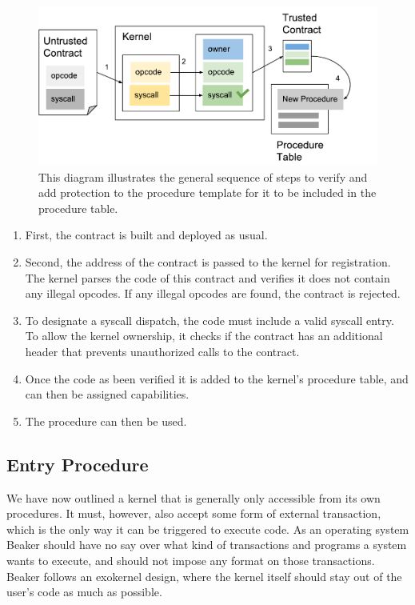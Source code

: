 \documentclass[english,a4paper]{article}
\begin{document}
\begin{figure}[htbp]
\centering
\includegraphics[width=1\textwidth]{media/ProcedureCreation.pdf}
\caption{This diagram illustrates the general sequence of steps to
verify and add protection to the procedure template for it to be
included in the procedure table.}
\end{figure}


\begin{enumerate}
\def\labelenumi{\arabic{enumi}.}
\item
  First, the contract is built and deployed as usual.
\item
  Second, the address of the contract is passed to the kernel for registration.
  The kernel parses the code of this contract and verifies it does not contain
  any illegal opcodes. If any illegal opcodes are found, the contract is
  rejected.
\item
  To designate a syscall dispatch, the code must include a valid syscall
  entry. To allow the kernel ownership, it checks if the contract has an
  additional header that prevents unauthorized calls to the contract.
\item
  Once the code as been verified it is added to the kernel's procedure table,
  and can then be assigned capabilities.
\item
  The procedure can then be used.
\end{enumerate}

\subsection{Entry Procedure}\label{entry-procedure}
We have now outlined a kernel that is generally only accessible from its
own procedures. It must, however, also accept some form of external
transaction, which is the only way it can be triggered to execute code.
As an operating system Beaker should have no say over what kind of
transactions and programs a system wants to execute, and should not impose any
format on those transactions. Beaker follows an
exokernel design, where the kernel itself should stay out of the user's
code as much as possible.
\end{document}
